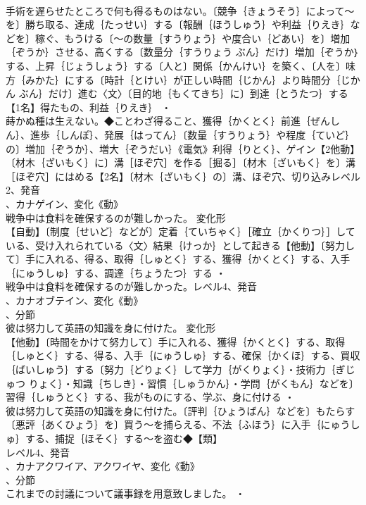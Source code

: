 \documentclass[8pt]{extreport}
\begin{document}
\begin{CJK}{UTF8}{min}
\\	手術を遅らせたところで何も得るものはない。〔競争｛きょうそう｝によって～を〕勝ち取る、達成｛たっせい｝する〔報酬｛ほうしゅう｝や利益｛りえき｝などを〕稼ぐ、もうける〔～の数量｛すうりょう｝や度合い｛どあい｝を〕増加｛ぞうか｝させる、高くする〔数量分｛すうりょう ぶん｝だけ〕増加｛ぞうか｝する、上昇｛じょうしょう｝する〔人と〕関係｛かんけい｝を築く、〔人を〕味方｛みかた｝にする〔時計｛とけい｝が正しい時間｛じかん｝より時間分｛じかん ぶん｝だけ〕進む〈文〉〔目的地｛もくてきち｝に〕到達｛とうたつ｝する【1名】得たもの、利益｛りえき｝ ・
\\	蒔かぬ種は生えない。◆ことわざ得ること、獲得｛かくとく｝前進｛ぜんしん｝、進歩｛しんぽ｝、発展｛はってん｝〔数量｛すうりょう｝や程度｛ていど｝の〕増加｛ぞうか｝、増大｛ぞうだい｝《電気》利得｛りとく｝、ゲイン【2他動】〔材木｛ざいもく｝に〕溝［ほぞ穴］を作る［掘る］〔材木｛ざいもく｝を〕溝［ほぞ穴］にはめる【2名】〔材木｛ざいもく｝の〕溝、ほぞ穴、切り込みレベル2、発音
\\	、カナゲイン、変化《動》
\\	戦争中は食料を確保するのが難しかった。	変化形 
\\	【自動】〔制度｛せいど｝などが〕定着｛ていちゃく｝［確立｛かくりつ｝］している、受け入れられている〈文〉結果｛けっか｝として起きる【他動】〔努力して〕手に入れる、得る、取得｛しゅとく｝する、獲得｛かくとく｝する、入手｛にゅうしゅ｝する、調達｛ちょうたつ｝する ・
\\	戦争中は食料を確保するのが難しかった。レベル4、発音
\\	、カナオブテイン、変化《動》
\\	、分節
\\	彼は努力して英語の知識を身に付けた。	変化形 
\\	【他動】〔時間をかけて努力して〕手に入れる、獲得｛かくとく｝する、取得｛しゅとく｝する、得る、入手｛にゅうしゅ｝する、確保｛かくほ｝する、買収｛ばいしゅう｝する〔努力｛どりょく｝して学力｛がくりょく｝・技術力｛ぎじゅつ りょく｝・知識｛ちしき｝・習慣｛しゅうかん｝・学問｛がくもん｝などを〕習得｛しゅうとく｝する、我がものにする、学ぶ、身に付ける ・
\\	彼は努力して英語の知識を身に付けた。〔評判｛ひょうばん｝などを〕もたらす〔悪評｛あくひょう｝を〕買う～を捕らえる、不法｛ふほう｝に入手｛にゅうしゅ｝する、捕捉｛ほそく｝する～を盗む◆【類】
\\	レベル4、発音
\\	、カナアクワイア、アクワイヤ、変化《動》
\\	、分節
\\	これまでの討議について議事録を用意致しました。 ・

\end{CJK}
\end{document}
